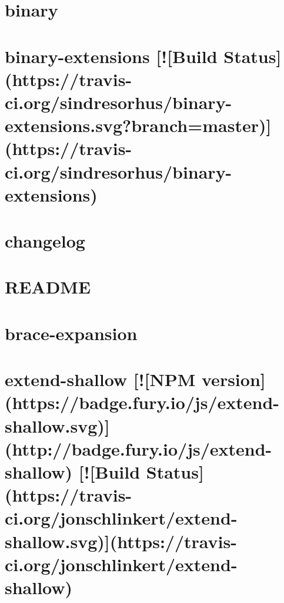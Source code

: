 \documentclass[twoside]{book}
\newcommand{\+}{\discretionary{\mbox{\scriptsize$\hookleftarrow$}}{}{}}
\begin{document}
\chapter{binary}
\label{md_dsmacc_vis_degree_node_modules_binary_README}

\chapter{binary-\/extensions \mbox{[}!\mbox{[}Build Status\mbox{]}(https\+://travis-\/ci.org/sindresorhus/binary-\/extensions.svg?branch=master)\mbox{]}(https\+://travis-\/ci.org/sindresorhus/binary-\/extensions)}
\label{md_dsmacc_vis_degree_node_modules_binary-extensions_readme}

\chapter{changelog}
\label{md_dsmacc_vis_degree_node_modules_bluebird_changelog}

\chapter{R\+E\+A\+D\+ME}
\label{md_dsmacc_vis_degree_node_modules_bluebird_README}

\chapter{brace-\/expansion}
\label{md_dsmacc_vis_degree_node_modules_brace-expansion_README}

\chapter{extend-\/shallow \mbox{[}!\mbox{[}N\+PM version\mbox{]}(https\+://badge.fury.\+io/js/extend-\/shallow.svg)\mbox{]}(http\+://badge.fury.\+io/js/extend-\/shallow) \mbox{[}!\mbox{[}Build Status\mbox{]}(https\+://travis-\/ci.org/jonschlinkert/extend-\/shallow.svg)\mbox{]}(https\+://travis-\/ci.org/jonschlinkert/extend-\/shallow)}
\label{md_dsmacc_vis_degree_node_modules_braces_node_modules_extend-shallow_README}

\end{document}
